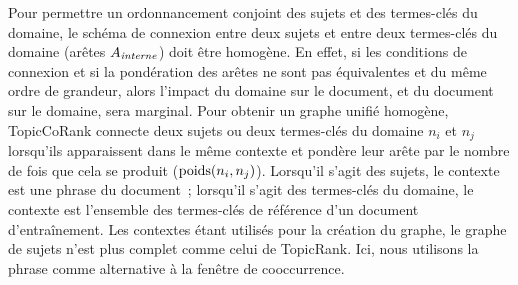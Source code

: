       Pour permettre un ordonnancement conjoint des sujets et des termes-clés
      du domaine, le schéma de connexion entre deux sujets et entre deux
      termes-clés du domaine (arêtes $A_\textnormal{\textit{interne}}$) doit
      être homogène. En effet, si les conditions de connexion et si la
      pondération des arêtes ne sont pas équivalentes et du
      même ordre de grandeur, alors l'impact du domaine sur
      le document, et du document sur le domaine, sera marginal. Pour
      obtenir un graphe unifié homogène, TopicCoRank connecte deux sujets ou
      deux termes-clés du domaine $n_i$ et $n_j$ lorsqu'ils apparaissent
      dans le même contexte et pondère leur arête par le nombre de fois que
      cela se produit ($\textnormal{poids}(n_i, n_j)$). Lorsqu'il s'agit des sujets, le contexte est
      une phrase du document~; lorsqu'il s'agit des
      termes-clés du domaine, le contexte est l'ensemble des termes-clés de
      référence d'un document d'entraînement. Les contextes
      étant utilisés pour la création du graphe, le graphe de sujets n'est
      plus complet comme celui de TopicRank. Ici, nous utilisons la phrase comme
      alternative à la fenêtre de cooccurrence.

